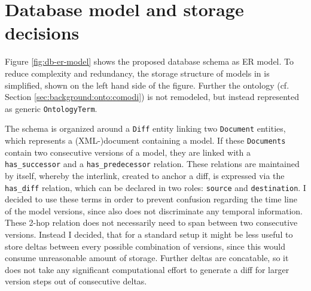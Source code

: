 \section{Database model and storage decisions}
\label{sec:concept:dbmodel}

Figure \ref{fig:db-er-model} shows the proposed database schema as ER model. To reduce complexity and redundancy, the storage structure of models in \masymos is simplified, shown on the left hand side of the figure. Further the \comodi ontology (cf. Section \ref{sec:background:onto:comodi}) is not remodeled, but instead represented as generic \texttt{OntologyTerm}.


The schema is organized around a \texttt{Diff} entity linking two \texttt{Document} entities, which represents a (XML-)document containing a model. If these \texttt{Documents} contain two consecutive versions of a model, they are linked with a \texttt{has\_successor} and a \texttt{has\_predecessor} relation. These relations are maintained by \masymos itself, whereby the interlink, created to anchor a diff, is expressed via the \texttt{has\_diff} relation, which can be declared in two roles: \texttt{source} and \texttt{destination}. I decided to use these terms in order to prevent confusion regarding the time line of the model versions, since \bives also does not discriminate any temporal information.
These 2-hop relation does not necessarily need to span between two consecutive versions.
Instead I decided, that for a standard setup it might be less useful to store deltas between every possible combination of versions, since this would consume unreasonable amount of storage.
Further deltas are concatable, so it does not take any significant computational effort to generate a diff for larger version steps out of consecutive deltas.

